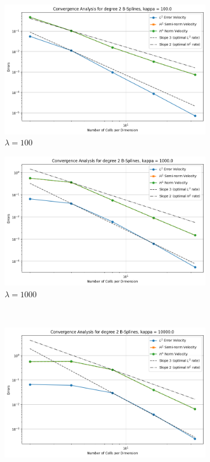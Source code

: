 \documentclass[a4paper,12pt,twoside]{report}
\begin{document}
\begin{figure}[!h]
	\centering
	\begin{subfigure}[b]{0.49\textwidth}
		\centering
		\includegraphics[width=\textwidth]{convergence_degree_2_non_mixed_kappa=100.0}
		\caption{$\lambda=100$}
	\end{subfigure}
	\begin{subfigure}[b]{0.49\textwidth}
		\centering
		\includegraphics[width=\textwidth]{convergence_degree_2_non_mixed_kappa=1000.0}
		\caption{$\lambda=1000$}
	\end{subfigure}
	\\
	\begin{subfigure}[b]{0.49\textwidth}
		\centering
		\includegraphics[width=\textwidth]{convergence_degree_2_non_mixed_kappa=10000.0}

\end{subfigure}
\end{figure}
\end{document}
